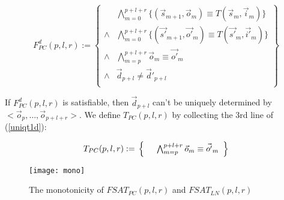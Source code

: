\begin{equation}\label{uniqt1d}
F^d_{PC}(p,l,r):=
\left\{
\begin{array}{cc}
&\bigwedge_{m=0}^{p+l+r}
\{
(\vec{s}_{m+1},\vec{o}_m)\equiv T(\vec{s}_m,\vec{i}_m)
\}
\\
\wedge&\bigwedge_{m=0}^{p+l+r}
\{
(\vec{s'}_{m+1},\vec{o'}_m)\equiv T(\vec{s'}_m,\vec{i'}_m)
\}
\\
\wedge&\bigwedge_{m=p}^{p+l+r}\vec{o}_m\equiv \vec{o'}_m \\
\wedge& \vec{d}_{p+l}\ne \vec{d}'_{p+l} \\
\end{array}
\right\}
\end{equation}

If $F^d_{PC}(p,l,r)$ is satisfiable,
then $\vec{d}_{p+l}$ can't be uniquely determined by $<\vec{o}_p,\dots,\vec{o}_{p+l+r}>$.
We define $T_{PC}(p,l,r)$ by collecting the 3rd line of (\ref{uniqt1d}):

\begin{equation}\label{tpc}
T_{PC}(p,l,r):=\\
\left\{
\begin{array}{cc}
      &\bigwedge_{m=p}^{p+l+r}\vec{o}_m\equiv \vec{o'}_m \\
\end{array}
\right\}
\end{equation}

\begin{figure}[b]
\begin{center}
\texttt{[image: mono]}
\end{center}
\caption{The monotonicity of $FSAT_{PC}(p,l,r)$ and $FSAT_{LN}(p,l,r)$}
  \label{fig_mono}
\end{figure}

